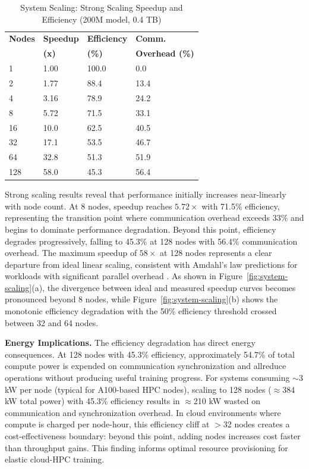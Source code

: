 \documentclass{llncs}
\begin{document}
\begin{table}[t]
\centering
\caption{System Scaling: Strong Scaling Speedup and Efficiency (200M model, 0.4 TB)}
\label{tab:system-scaling}
\begin{tabular*}{\columnwidth}{@{\extracolsep{\fill}} llll @{}}
\toprule
\textbf{Nodes} & \textbf{Speedup} & \textbf{Efficiency} & \textbf{Comm.} \\
 & \textbf{(x)} & \textbf{(\%)} & \textbf{Overhead (\%)} \\
\midrule
1 & 1.00 & 100.0 & 0.0 \\
2 & 1.77 & 88.4 & 13.4 \\
4 & 3.16 & 78.9 & 24.2 \\
8 & 5.72 & 71.5 & 33.1 \\
16 & 10.0 & 62.5 & 40.5 \\
32 & 17.1 & 53.5 & 46.7 \\
64 & 32.8 & 51.3 & 51.9 \\
128 & 58.0 & 45.3 & 56.4 \\
\bottomrule
\end{tabular*}
\end{table}

Strong scaling results reveal that performance initially increases near-linearly with node count. At 8 nodes, speedup reaches $5.72\times$ with 71.5\% efficiency, representing the transition point where communication overhead exceeds 33\% and begins to dominate performance degradation. Beyond this point, efficiency degrades progressively, falling to 45.3\% at 128 nodes with 56.4\% communication overhead. The maximum speedup of $58\times$ at 128 nodes represents a clear departure from ideal linear scaling, consistent with Amdahl's law predictions for workloads with significant parallel overhead \cite{Amdahl1967}. As shown in Figure~\ref{fig:system-scaling}(a), the divergence between ideal and measured speedup curves becomes pronounced beyond 8 nodes, while Figure~\ref{fig:system-scaling}(b) shows the monotonic efficiency degradation with the 50\% efficiency threshold crossed between 32 and 64 nodes.

\textbf{Energy Implications.} The efficiency degradation has direct energy consequences. At 128 nodes with 45.3\% efficiency, approximately 54.7\% of total compute power is expended on communication synchronization and allreduce operations without producing useful training progress. For systems consuming $\sim$3 kW per node (typical for A100-based HPC nodes), scaling to 128 nodes ($\approx$384 kW total power) with 45.3\% efficiency results in $\approx$210 kW wasted on communication and synchronization overhead. In cloud environments where compute is charged per node-hour, this efficiency cliff at $>$32 nodes creates a cost-effectiveness boundary: beyond this point, adding nodes increases cost faster than throughput gains. This finding informs optimal resource provisioning for elastic cloud-HPC training.
\end{document}
